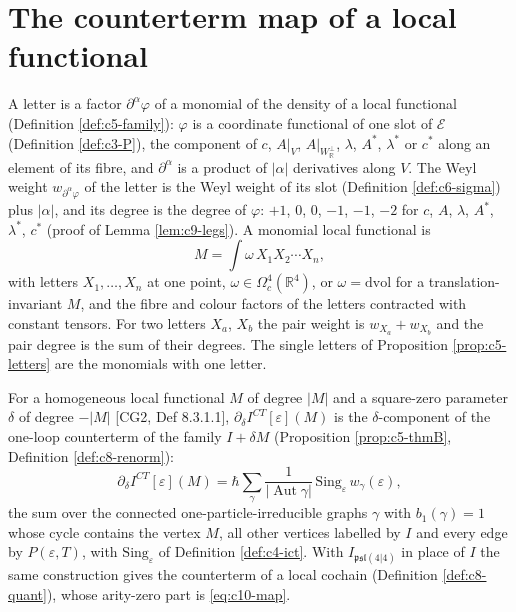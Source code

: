 \section{The counterterm map of a local functional}

\begin{definition}
\label{def:c10-letters}
A letter is a factor $\partial^\alpha\varphi$ of a monomial of the density of a local functional (Definition \ref{def:c5-family}): $\varphi$ is a coordinate functional of one slot of $\mathscr E$ (Definition \ref{def:c3-P}), the component of $c$, $A|_V$, $A|_{W_{\mathbb R}^\perp}$, $\lambda$, $A^*$, $\lambda^*$ or $c^*$ along an element of its fibre, and $\partial^\alpha$ is a product of $|\alpha|$ derivatives along $V$. The Weyl weight $w_{\partial^\alpha\varphi}$ of the letter is the Weyl weight of its slot (Definition \ref{def:c6-sigma}) plus $|\alpha|$, and its degree is the degree of $\varphi$: $+1$, $0$, $0$, $-1$, $-1$, $-2$ for $c$, $A$, $\lambda$, $A^*$, $\lambda^*$, $c^*$ (proof of Lemma \ref{lem:c9-legs}). A monomial local functional is
\[
M=\int\omega\,X_1X_2\cdots X_n,
\]
with letters $X_1,\dots,X_n$ at one point, $\omega\in\Omega^4_c(\mathbb R^4)$, or $\omega=\mathrm{dvol}$ for a translation-invariant $M$, and the fibre and colour factors of the letters contracted with constant tensors. For two letters $X_a$, $X_b$ the pair weight is $w_{X_a}+w_{X_b}$ and the pair degree is the sum of their degrees. The single letters of Proposition \ref{prop:c5-letters} are the monomials with one letter.
\end{definition}

For a homogeneous local functional $M$ of degree $|M|$ and a square-zero parameter $\delta$ of degree $-|M|$ [CG2, Def 8.3.1.1], $\partial_\delta I^{CT}[\varepsilon](M)$ is the $\delta$-component of the one-loop counterterm of the family $I+\delta M$ (Proposition \ref{prop:c5-thmB}, Definition \ref{def:c8-renorm}):
\begin{equation}
\partial_\delta I^{CT}[\varepsilon](M)=\hbar\sum_\gamma\frac1{|\operatorname{Aut}\gamma|}\,\mathrm{Sing}_\varepsilon\,w_\gamma(\varepsilon),
\label{eq:c10-map}
\end{equation}
the sum over the connected one-particle-irreducible graphs $\gamma$ with $b_1(\gamma)=1$ whose cycle contains the vertex $M$, all other vertices labelled by $I$ and every edge by $P(\varepsilon,T)$, with $\mathrm{Sing}_\varepsilon$ of Definition \ref{def:c4-ict}. With $I_{\mathfrak{psl}(4|4)}$ in place of $I$ the same construction gives the counterterm of a local cochain (Definition \ref{def:c8-quant}), whose arity-zero part is \eqref{eq:c10-map}.

